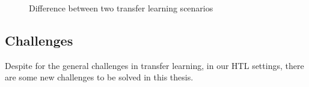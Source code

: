 \begin{figure}[h]
	\centering
	\qquad
	\caption{Difference between two transfer learning scenarios}\label{fig:intro:cmp}
\end{figure}

\subsection{Challenges}
Despite for the general challenges in transfer learning, in our HTL settings, there are some new challenges to be solved in this thesis.

